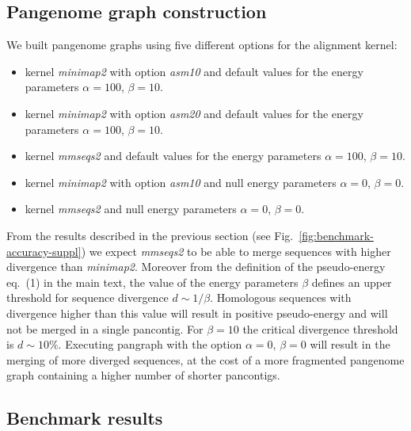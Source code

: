\documentclass[aps,rmp,reprint,superscriptaddress,notitlepage,10pt,onecolumn]{revtex4-1}
\begin{document}
\subsection{Pangenome graph construction}

We built pangenome graphs using five different options for the alignment kernel:
\begin{itemize}
    \itemsep1pt
    \item kernel \textit{minimap2} with option \textit{asm10} and default values for the energy parameters $\alpha=100$, $\beta=10$.
    \item kernel \textit{minimap2} with option \textit{asm20} and default values for the energy parameters $\alpha=100$, $\beta=10$.
    \item kernel \textit{mmseqs2} and default values for the energy parameters $\alpha=100$, $\beta=10$.
    \item kernel \textit{minimap2} with option \textit{asm10} and null energy parameters $\alpha=0$, $\beta=0$.
    \item kernel \textit{mmseqs2} and null energy parameters $\alpha=0$, $\beta=0$.
\end{itemize}
From the results described in the previous section (see Fig.~\ref{fig:benchmark-accuracy-suppl}) we expect \textit{mmseqs2} to be able to merge sequences with higher divergence than \textit{minimap2}. Moreover from the definition of the pseudo-energy eq.~(1) in the main text, the value of the energy parameters $\beta$ defines an upper threshold for sequence divergence $d \sim 1/\beta$. Homologous sequences with divergence higher than this value will result in positive pseudo-energy and will not be merged in a single pancontig. For $\beta=10$ the critical divergence threshold is $d \sim 10\%$. Executing pangraph with the option $\alpha=0$, $\beta=0$ will result in the merging of more diverged sequences, at the cost of a more fragmented pangenome graph containing a higher number of shorter pancontigs.


\subsection{Benchmark results}
\end{document}
